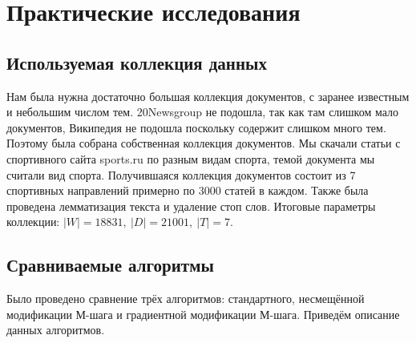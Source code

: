 \documentclass[12pt]{article}
\begin{document}
	\section{Практические исследования}
\subsection{Используемая коллекция данных}
Нам была нужна достаточно большая коллекция документов, с заранее известным  и небольшим числом тем. 20Newsgroup не подошла, так как там слишком мало документов, Википедия не подошла поскольку содержит слишком много тем. Поэтому была собрана собственная коллекция документов. Мы скачали статьи с спортивного сайта sports.ru по разным видам спорта, темой документа мы считали вид спорта. Получившаяся коллекция документов состоит из 7 спортивных направлений примерно по 3000 статей в каждом. Также была проведена лемматизация текста и удаление стоп слов. Итоговые параметры коллекции: $|W| = 18831,~|D| = 21001,~|T| = 7$.
	\subsection{Сравниваемые алгоритмы}
Было проведено сравнение трёх алгоритмов: стандартного, несмещённой модификации М-шага и градиентной модификации М-шага. Приведём описание данных алгоритмов.
\end{document}
